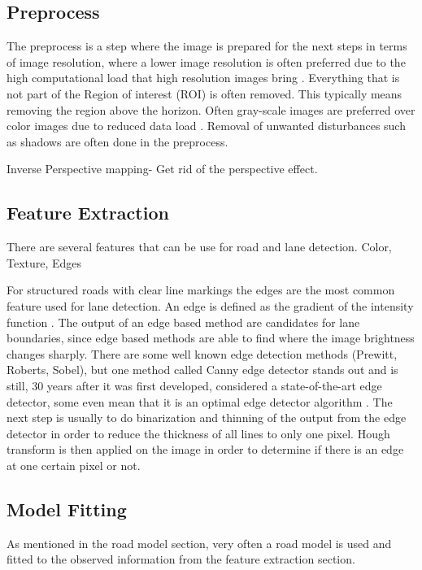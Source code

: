 \subsection{Preprocess}
The preprocess is a step where the image is prepared for the next steps in terms of image resolution, where a lower image resolution is often preferred due to the high computational load that high resolution images bring \cite{Yenikaya:2013:KVR:2522968.2522970}. Everything that is not part of the Region of interest (ROI) is often removed. This typically means removing the region above the horizon. Often gray-scale images are preferred over color images due to reduced data load \cite{Yenikaya:2013:KVR:2522968.2522970}. Removal of unwanted disturbances such as shadows are often done in the preprocess. 


Inverse Perspective mapping- Get rid of the perspective effect. 

\subsection{Feature Extraction}
There are several features that can be use for road and lane detection. Color, Texture, Edges

For structured roads with clear line markings the edges are the most common feature used for lane detection. An edge is defined as the gradient of the intensity function \cite{Yenikaya:2013:KVR:2522968.2522970}. The output of an edge based method are candidates for lane boundaries, since edge based methods are able to find where the image brightness changes sharply. There are some well known edge detection methods (Prewitt, Roberts, Sobel), but one method called Canny edge detector stands out and is still, 30 years after it was first developed, considered a state-of-the-art edge detector, some even mean that it is an optimal edge detector algorithm \cite{bhadauria2013comparison}. The next step is usually to do binarization and thinning of the output from the edge detector in order to reduce the thickness of all lines to only one pixel. Hough transform is then applied on the image in order to determine if there is an edge at one certain pixel or not. 


\subsection{Model Fitting}
As mentioned in the road model section, very often a road model is used and fitted to the observed information from the feature extraction section. 

